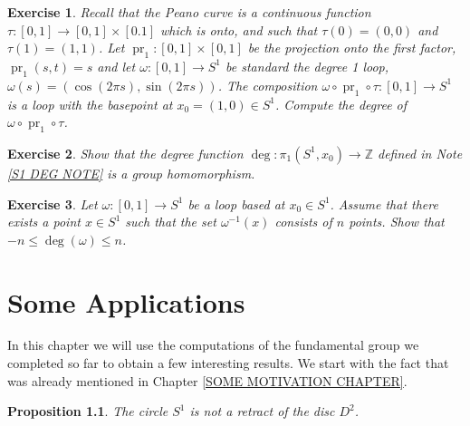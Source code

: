 \documentclass[11pt, letterpaper, oneside]{report}
\renewcommand{\chaptermark}[1]{\markboth{#1}{}}
\theoremstyle{pplain}
\newtheorem{proposition}[theorem]{Proposition}
\theoremstyle{ddefinition}
\theoremstyle{nnn}
\theoremstyle{eexercise}
\newtheorem{exercise}{Exercise}[chapter]
\newcommand{\Z}{{\mathbb Z}}
\DeclareMathOperator\pr{pr}
\begin{document}
\begin{exercise}
Recall that the Peano curve is a continuous function $\tau \colon [0, 1] \to [0, 1]\times [0. 1]$ which is onto, 
and such that $\tau(0) = (0, 0)$ and $\tau(1) = (1, 1)$. Let $\pr_{1}\colon [0, 1] \times [0, 1]$ be the projection 
onto the first factor, $\pr_{1}(s, t) = s$ and let $\omega\colon [0, 1] \to S^{1}$ be standard the degree 1 loop, 
$\omega(s) = (\cos(2\pi s), \sin(2 \pi s))$.  The composition $\omega \circ \pr_{1}\circ \tau \colon [0, 1] \to S^{1}$
is a loop with the basepoint at $x_{0} = (1, 0)\in S^{1}$. Compute the degree of $\omega \circ \pr_{1}\circ \tau$. 
\end{exercise}








\begin{exercise}
Show that the degree function $\deg\colon \pi_{1}(S^{1}, x_{0}) \to \Z$  defined in Note \ref{S1 DEG NOTE}
is a group homomorphism. 
\end{exercise}



\begin{exercise}
Let $\omega \colon [0, 1] \to S^{1}$ be a loop based at  $x_{0}\in S^{1}$. Assume that there exists a point 
$x\in S^{1}$ such that the set $\omega^{-1}(x)$ consists of $n$ points. Show that $-n \leq \deg(\omega) \leq n$. 
\end{exercise}


\newpage

\chapter{Some Applications}
\chaptermark{Some Applications}
\label{SOME APPLICATIONS CHAPTER}

\thispagestyle{firststyle}

In this chapter we will use the computations of the fundamental group we completed so far to 
obtain a few interesting results. We start with the fact that was already mentioned
in Chapter \ref{SOME MOTIVATION CHAPTER}. 

\begin{proposition}
\label{S1 NOT D2 RETRACT PROP}
The circle $S^{1}$ is not a retract of the disc $D^{2}$. 
\end{proposition}
\end{document}
